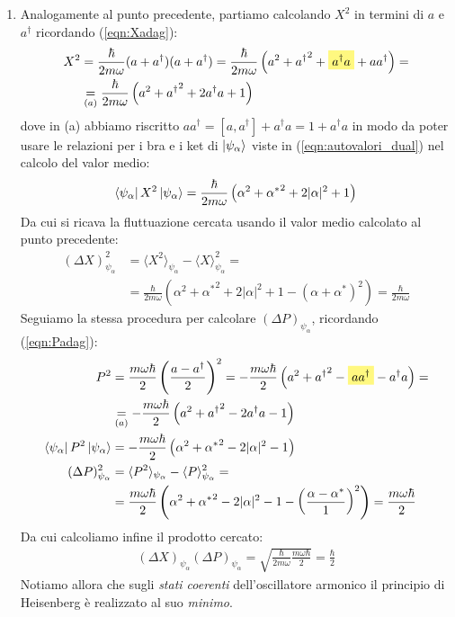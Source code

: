 \documentclass[../../FisicaTeorica.tex]{subfiles}
\begin{document}
\begin{enumerate}
\item Analogamente al punto precedente, partiamo calcolando $X^2$ in termini di $a $ e $a^\dag$ ricordando (\ref{eqn:Xadag}):
\begin{align*}
X^2 &= \frac{\hbar}{2m\omega} (a+ a^\dag)(a+a^\dag) = \frac{\hbar}{2m\omega}\left( a^2 + {a^\dag}^2 + \hlc{Yellow}{a^\dag a} + {a a^\dag} \right)=\\
&\underset{(a)}{=} \frac{\hbar}{2m\omega}\left(a^2 + {a^\dag}^2 + 2a^\dag a + 1\right)
\end{align*}
dove in (a) abbiamo riscritto $aa^\dag = [a,a^\dag] + a^\dag a = 1+ a^\dag a$ in modo da poter usare le relazioni per i bra e i ket di $\Ket{\psi_\alpha}$ viste in (\ref{eqn:autovalori_dual}) nel calcolo del valor medio:
\begin{align*}
\Bra{\psi_\alpha}X^2\Ket{\psi_\alpha}=\frac{\hbar}{2m\omega} \left(\alpha^2 + {\alpha^*}^2 + 2|\alpha|^2 + 1\right)
\end{align*}
Da cui si ricava la fluttuazione cercata usando il valor medio calcolato al punto precedente:
\begin{align*}
(\Delta X)^2_{\psi_\alpha} &= \langle X^2 \rangle_{\psi_\alpha} - \langle X \rangle^2_{\psi_\alpha}=\\
&= \frac{\hbar}{2m\omega} \left( \alpha^2 + {\alpha^*}^2 + 2|\alpha|^2 + 1- (\alpha + \alpha^*)^2\right) = \frac{\hbar}{2m\omega}
\end{align*}
Seguiamo la stessa procedura per calcolare $(\Delta P)_{\psi_\alpha}$, ricordando (\ref{eqn:Padag}):
\begin{align*}
P^2 &= \frac{m\omega \hbar}{2} \left(\frac{a-a^\dag}{2}\right)^2 = -\frac{m\omega \hbar}{2} \left(a^2 + {a^\dag}^2 - \hlc{Yellow}{{aa^\dag} }-a^\dag a\right) =\\
&\underset{(a)}{=}-\frac{m\omega \hbar}{2}\left( a^2 + {a^\dag}^2 -2a^\dag a -1\right)\\
\bra{\psi_\alpha}P^2 \ket{\psi_\alpha} &=-\frac{m\omega\hbar}{2}\left(\alpha^2 + {\alpha^*}^2 - 2|\alpha|^2 -1\right)\\
(\Delta P)^2_{\psi_\alpha} &= \langle P^2 \rangle_{\psi_\alpha} - \langle P \rangle^2_{\psi_\alpha} = \\
&=\frac{m\omega \hbar}{2} \left( \alpha^2 + {\alpha^*}^2 -2|\alpha|^2 -1 -\left(\frac{\alpha-\alpha^*}{1}\right)^2\right)= \frac{m\omega \hbar}{2}
\end{align*}
Da cui calcoliamo infine il prodotto cercato:
\begin{align*}
(\Delta X)_{\psi_\alpha}(\Delta P)_{\psi_\alpha} = \sqrt{\frac{\hbar}{2m\omega}\frac{m\omega \hbar}{2}} =\frac{\hbar}{2}
\end{align*}
Notiamo allora che sugli \textit{stati coerenti} dell'oscillatore armonico il principio di Heisenberg è realizzato al suo \textit{minimo}.


\end{enumerate}
\end{document}
